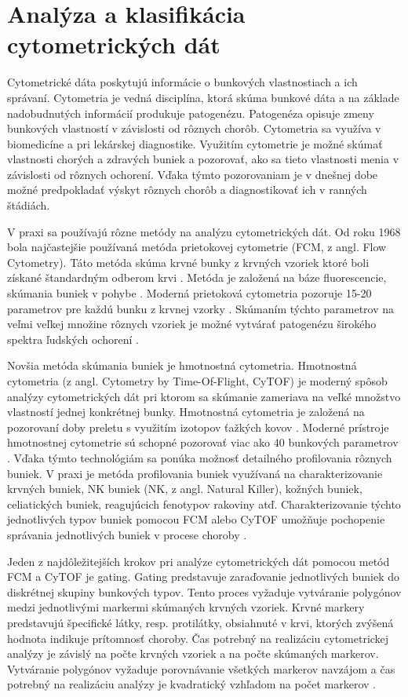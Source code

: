 \chapter{Analýza a klasifikácia cytometrických dát}
\label{DeepCyTOF_kap3}

Cytometrické dáta poskytujú informácie o bunkových vlastnostiach a ich správaní. Cytometria je vedná disciplína, ktorá skúma bunkové dáta a na základe nadobudnutých informácií produkuje patogenézu. Patogenéza opisuje zmeny bunkových vlastností v závislosti od rôznych chorôb. Cytometria sa využíva v biomedicíne a pri lekárskej diagnostike. Využitím cytometrie je možné skúmať vlastnosti chorých a zdravých buniek a pozorovať, ako sa tieto vlastnosti menia v závislosti od rôznych ochorení. Vďaka týmto pozorovaniam je v dnešnej dobe možné predpokladať výskyt rôznych chorôb a diagnostikovať ich v ranných štádiách. 

V praxi sa používajú rôzne metódy na analýzu cytometrických dát. Od roku 1968 bola najčastejšie používaná metóda prietokovej cytometrie (FCM, z angl. Flow Cytometry). Táto metóda skúma krvné bunky z krvných vzoriek ktoré boli získané štandardným odberom krvi \cite{Li2016}. Metóda je založená na báze fluorescencie, skúmania buniek v pohybe \cite{Roubalova1934}. Moderná prietoková cytometria pozoruje 15-20 parametrov pre každú bunku z krvnej vzorky \cite{Roubalova1934}. Skúmaním týchto parametrov na veľmi veľkej množine rôznych vzoriek je možné vytvárať patogenézu širokého spektra ľudských ochorení \cite{Li2017}. 

Novšia metóda skúmania buniek je hmotnostná cytometria. Hmotnostná cytometria (z angl. Cytometry by Time-Of-Flight, CyTOF) je moderný spôsob analýzy cytometrických dát pri ktorom sa skúmanie zameriava na veľké množstvo vlastností jednej konkrétnej bunky. Hmotnostná cytometria je založená na pozorovaní doby preletu s využitím izotopov ťažkých kovov \cite{Roubalova1934}. Moderné prístroje hmotnostnej cytometrie sú schopné pozorovať viac ako 40 bunkových parametrov \cite{Roubalova1934, Li2017}. Vďaka týmto technológiám sa ponúka možnosť detailného profilovania rôznych buniek. V praxi je metóda profilovania buniek využívaná na charakterizovanie krvných buniek, NK buniek (NK, z angl. Natural Killer), kožných buniek, celiatických buniek, reagujúcich fenotypov rakoviny atď. Charakterizovanie týchto jednotlivých typov buniek pomocou FCM alebo CyTOF umožňuje pochopenie správania jednotlivých buniek v procese choroby \cite{Li2016}.

Jeden z najdôležitejších krokov pri analýze cytometrických dát pomocou metód FCM a CyTOF je gating. Gating predstavuje zaraďovanie jednotlivých buniek do diskrétnej skupiny bunkových typov. Tento proces vyžaduje vytváranie polygónov medzi jednotlivými markermi skúmaných krvných vzoriek. Krvné markery predstavujú špecifické látky, resp. protilátky, obsiahnuté v krvi, ktorých zvýšená hodnota indikuje prítomnosť choroby. Čas potrebný na realizáciu cytometrickej analýzy je závislý na počte krvných vzoriek a na počte skúmaných markerov. Vytváranie polygónov vyžaduje porovnávanie všetkých markerov navzájom a čas potrebný na realizáciu analýzy je kvadratický vzhľadom na počet markerov \cite{Li2016}. 

